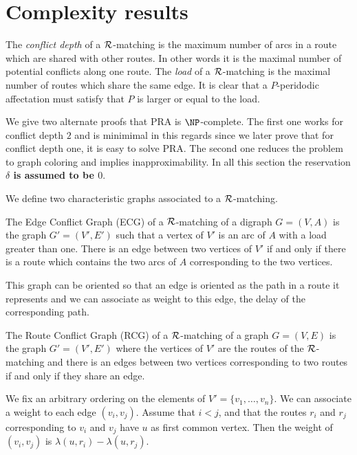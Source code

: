 \documentclass{article}
\newcommand\rmatching{$\cal R$-matching\xspace}
\begin{document}
\section{Complexity results}


The \emph{conflict depth} of a $\cal R$-matching is the maximum number of arcs in a route which are 
shared with other routes. In other words it is the maximal number of potential conflicts along one route. 
The \emph{load} of a $\cal R$-matching is the maximal number of routes which share the same edge.
It is clear that a $P$-peridodic affectation must satisfy that $P$ is larger or equal to the load.

We give two alternate proofs that PRA is $\NP$-complete.
The first one works for conflict depth $2$ and is minimimal in this regards since we later prove that for conflict depth one,
it is easy to solve PRA. The second one reduces the problem to graph coloring and implies inapproximability. 
In all this section the reservation \textbf{$\delta$ is assumed to be $0$}.


We define two characteristic graphs associated to a $\cal R$-matching.

\begin{definition}
  The Edge Conflict Graph (ECG) of a \rmatching of a digraph $G=(V,A)$ is the graph $G'=(V',E')$ such that 
  a vertex of $V'$ is an arc of $A$ with a load greater than one. There is an edge between two vertices of $V'$
  if and only if there is a route which contains the two arcs of $A$ corresponding to the two vertices.
  
  This graph can be oriented so that an edge is oriented as the path in a route it represents and
  we can associate as weight to this edge, the delay of the corresponding path.
\end{definition}


\begin{definition}
The Route Conflict Graph (RCG) of a \rmatching of a graph $G=(V,E)$ is the graph $G'=(V',E')$ where 
the vertices of $V'$ are the routes of the  \rmatching and there is an edges between two vertices
corresponding to two routes if and only if they share an edge.

We fix an arbitrary ordering on the elements of $V'=\{v_1,\dots,v_n\}$.
We can associate a weight to each edge $(v_i,v_j)$. Assume that $i < j$, 
and that the routes $r_i$ and $r_j$ corresponding to $v_i$ and $v_j$ have $u$ as first common vertex.
Then the weight of $(v_i,v_j)$ is $\lambda(u,r_i) - \lambda(u,r_j)$.
\end{definition}
\end{document}
